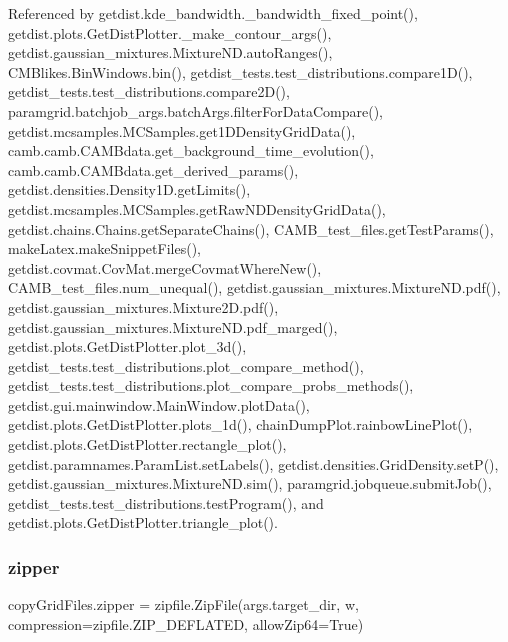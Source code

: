 Referenced by getdist.\+kde\+\_\+bandwidth.\+\_\+bandwidth\+\_\+fixed\+\_\+point(), getdist.\+plots.\+Get\+Dist\+Plotter.\+\_\+make\+\_\+contour\+\_\+args(), getdist.\+gaussian\+\_\+mixtures.\+Mixture\+N\+D.\+auto\+Ranges(), C\+M\+Blikes.\+Bin\+Windows.\+bin(), getdist\+\_\+tests.\+test\+\_\+distributions.\+compare1\+D(), getdist\+\_\+tests.\+test\+\_\+distributions.\+compare2\+D(), paramgrid.\+batchjob\+\_\+args.\+batch\+Args.\+filter\+For\+Data\+Compare(), getdist.\+mcsamples.\+M\+C\+Samples.\+get1\+D\+Density\+Grid\+Data(), camb.\+camb.\+C\+A\+M\+Bdata.\+get\+\_\+background\+\_\+time\+\_\+evolution(), camb.\+camb.\+C\+A\+M\+Bdata.\+get\+\_\+derived\+\_\+params(), getdist.\+densities.\+Density1\+D.\+get\+Limits(), getdist.\+mcsamples.\+M\+C\+Samples.\+get\+Raw\+N\+D\+Density\+Grid\+Data(), getdist.\+chains.\+Chains.\+get\+Separate\+Chains(), C\+A\+M\+B\+\_\+test\+\_\+files.\+get\+Test\+Params(), make\+Latex.\+make\+Snippet\+Files(), getdist.\+covmat.\+Cov\+Mat.\+merge\+Covmat\+Where\+New(), C\+A\+M\+B\+\_\+test\+\_\+files.\+num\+\_\+unequal(), getdist.\+gaussian\+\_\+mixtures.\+Mixture\+N\+D.\+pdf(), getdist.\+gaussian\+\_\+mixtures.\+Mixture2\+D.\+pdf(), getdist.\+gaussian\+\_\+mixtures.\+Mixture\+N\+D.\+pdf\+\_\+marged(), getdist.\+plots.\+Get\+Dist\+Plotter.\+plot\+\_\+3d(), getdist\+\_\+tests.\+test\+\_\+distributions.\+plot\+\_\+compare\+\_\+method(), getdist\+\_\+tests.\+test\+\_\+distributions.\+plot\+\_\+compare\+\_\+probs\+\_\+methods(), getdist.\+gui.\+mainwindow.\+Main\+Window.\+plot\+Data(), getdist.\+plots.\+Get\+Dist\+Plotter.\+plots\+\_\+1d(), chain\+Dump\+Plot.\+rainbow\+Line\+Plot(), getdist.\+plots.\+Get\+Dist\+Plotter.\+rectangle\+\_\+plot(), getdist.\+paramnames.\+Param\+List.\+set\+Labels(), getdist.\+densities.\+Grid\+Density.\+set\+P(), getdist.\+gaussian\+\_\+mixtures.\+Mixture\+N\+D.\+sim(), paramgrid.\+jobqueue.\+submit\+Job(), getdist\+\_\+tests.\+test\+\_\+distributions.\+test\+Program(), and getdist.\+plots.\+Get\+Dist\+Plotter.\+triangle\+\_\+plot().

\mbox{\label{namespacecopyGridFiles_a145a972869b1a7467b372117e7d1112a}} 
\subsubsection{\texorpdfstring{zipper}{zipper}}
{\footnotesize\ttfamily copy\+Grid\+Files.\+zipper = zipfile.\+Zip\+File(args.\+target\+\_\+dir, \textquotesingle{}w\textquotesingle{}, compression=zipfile.\+Z\+I\+P\+\_\+\+D\+E\+F\+L\+A\+T\+ED, allow\+Zip64=True)}

